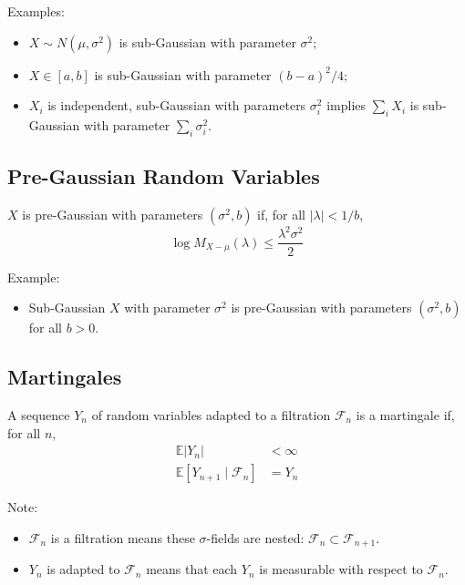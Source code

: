 Examples:

\begin{itemize}
  \item $X \sim N(\mu, \sigma^2)$ is sub-Gaussian with parameter $\sigma^2$;
  \item $X \in [a,b]$ is sub-Gaussian with parameter $(b-a)^2 /4$;
  \item $X_{i}$ is independent, sub-Gaussian with parameters $\sigma_{i}^2$ implies $\sum_{i}X_{i}$ is sub-Gaussian with parameter $\sum_{i}\sigma_{i}^2$.
\end{itemize}

\subsection{Pre-Gaussian Random Variables}
\begin{definition} \cite*{Bartlett:2020}
  $X$ is pre-Gaussian with parameters $(\sigma^2,b)$ if, for all $\left| \lambda \right| < 1/b$,
  \begin{equation}
    \log M_{X-\mu}(\lambda) \leq \frac{\lambda^{2} \sigma^{2}}{2}
  \end{equation}
\end{definition}

Example:

\begin{itemize}
  \item Sub-Gaussian $X$ with parameter $\sigma^2$ is pre-Gaussian with parameters $(\sigma^2, b)$ for all $b>0$.
\end{itemize}

\subsection{Martingales}

\begin{definition} \cite*{Bartlett:2020}
  A sequence $Y_n$ of random variables adapted to a filtration $\mathcal{F}_n$ is a martingale if, for all $n$,
  \begin{equation}
    \begin{aligned}
    \mathbb{E}\left|Y_{n}\right| &<\infty \\
    \mathbb{E}\left[Y_{n+1} \mid \mathcal{F}_{n}\right] &=Y_{n}
    \end{aligned}
  \end{equation}
\end{definition}

Note:

\begin{itemize}
  \item $\mathcal{F}_{n}$ is a filtration means these $\sigma$-fields are nested: $\mathcal{F}_{n} \subset \mathcal{F}_{n+1}$.
  \item $Y_n$ is adapted to $\mathcal{F}_{n}$ means  that each $Y_n$ is measurable with respect to $\mathcal{F}_n$.
\end{itemize}

